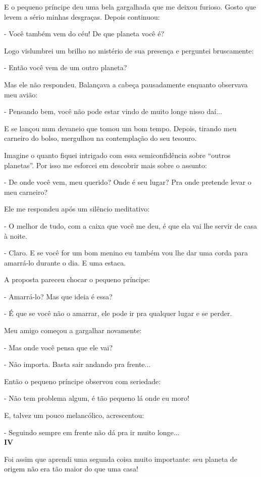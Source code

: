 \begin{Parallel}[p]{}{}
{E o pequeno príncipe deu uma bela gargalhada que me deixou furioso.
Gosto que levem a sério minhas desgraças. Depois continuou:

- Você também vem do céu! De que planeta você é?

Logo vislumbrei um brilho no mistério de sua presença e perguntei
bruscamente:

- Então você vem de um outro planeta?

Mas ele não respondeu. Balançava a cabeça pausadamente enquanto
observava meu avião:

- Pensando bem, você não pode estar vindo de muito longe nisso daí...

E se lançou num devaneio que tomou um bom tempo. Depois, tirando meu
carneiro do bolso, mergulhou na contemplação do seu tesouro.

Imagine o quanto fiquei intrigado com essa semiconfidência sobre
``outros planetas''. Por isso me esforcei em descobrir mais sobre o
assunto:

- De onde você vem, meu querido? Onde é seu lugar? Pra onde pretende
levar o meu carneiro?

Ele me respondeu após um silêncio meditativo:

- O melhor de tudo, com a caixa que você me deu, é que ela vai lhe
servir de casa à noite.

- Claro. E se você for um bom menino eu também vou lhe dar uma corda
para amarrá-lo durante o dia. E uma estaca.

A proposta pareceu chocar o pequeno príncipe:

- Amarrá-lo? Mas que ideia é essa?

- É que se você não o amarrar, ele pode ir pra qualquer lugar e se
perder.

Meu amigo começou a gargalhar novamente:

- Mas onde você pensa que ele vai?

- Não importa. Basta sair andando pra frente...

Então o pequeno príncipe observou com seriedade:

- Não tem problema algum, é tão pequeno lá onde eu moro!

E, talvez um pouco melancólico, acrescentou:

- Seguindo sempre em frente não dá pra ir muito longe...\\

\textbf{IV}

Foi assim que aprendi uma segunda coisa muito importante: seu planeta de
origem não era tão maior do que uma casa!

}
\end{Parallel}
